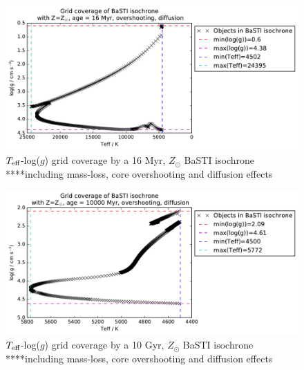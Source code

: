 \documentclass[12pt, a4paper]{report}
\begin{document}
\begin{figure}
\includegraphics[scale=0.4]{../wfc3_16_23Myr_10Gyr_complex_solar/wfc3_ATLAS9_grid_BaSTI_coverage_c16_complex_Zsol_4500.pdf}
\caption{$T_{\textnormal{eff}}$-log($g$) grid coverage by a 16 Myr, $Z_{\odot}$ BaSTI isochrone ****including mass-loss, core overshooting and diffusion effects}
\label{BaSTI_coverage_16M}
\end{figure}

\begin{figure}
\includegraphics[scale=0.4]{../wfc3_16_23Myr_10Gyr_complex_solar/wfc3_ATLAS9_grid_BaSTI_coverage_c10000_complex_Zsol_4500.pdf}
\caption{$T_{\textnormal{eff}}$-log($g$) grid coverage by a 10 Gyr, $Z_{\odot}$ BaSTI isochrone ****including mass-loss, core overshooting and diffusion effects}
\label{BaSTI_coverage_10G}
\end{figure}
\end{document}
